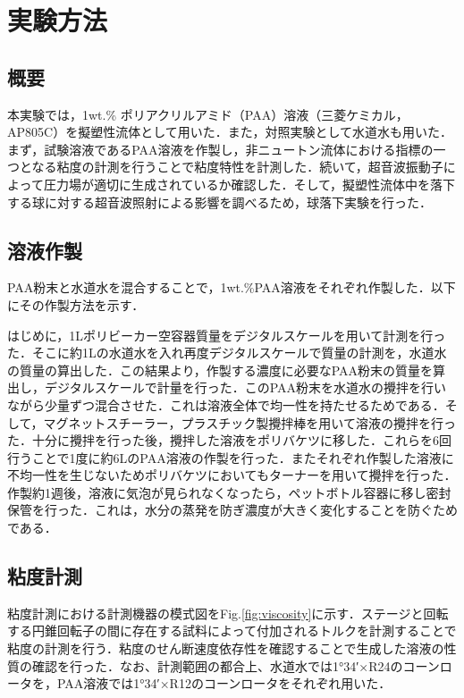 \section{実験方法}
\label{sec:methods}
\subsection{概要}
本実験では，1wt.\% ポリアクリルアミド（PAA）溶液（三菱ケミカル，AP805C）を擬塑性流体として用いた．また，対照実験として水道水も用いた．まず，試験溶液であるPAA溶液を作製し，非ニュートン流体における指標の一つとなる粘度の計測を行うことで粘度特性を計測した．続いて，超音波振動子によって圧力場が適切に生成されているか確認した．そして，擬塑性流体中を落下する球に対する超音波照射による影響を調べるため，球落下実験を行った．

\subsection{溶液作製}

PAA粉末と水道水を混合することで，1wt.\%PAA溶液をそれぞれ作製した．以下にその作製方法を示す．

はじめに，1Lポリビーカー空容器質量をデジタルスケールを用いて計測を行った．そこに約1Lの水道水を入れ再度デジタルスケールで質量の計測を，水道水の質量の算出した．この結果より，作製する濃度に必要なPAA粉末の質量を算出し，デジタルスケールで計量を行った．このPAA粉末を水道水の攪拌を行いながら少量ずつ混合させた．これは溶液全体で均一性を持たせるためである．そして，マグネットスチーラー，プラスチック製攪拌棒を用いて溶液の攪拌を行った．十分に攪拌を行った後，攪拌した溶液をポリバケツに移した．これらを6回行うことで1度に約6LのPAA溶液の作製を行った．またそれぞれ作製した溶液に不均一性を生じないためポリバケツにおいてもターナーを用いて攪拌を行った．作製約1週後，溶液に気泡が見られなくなったら，ペットボトル容器に移し密封保管を行った．これは，水分の蒸発を防ぎ濃度が大きく変化することを防ぐためである．

\subsection{粘度計測}
粘度計測における計測機器の模式図をFig.\ref{fig:viscosity}に示す．ステージと回転する円錐回転子の間に存在する試料によって付加されるトルクを計測することで粘度の計測を行う．粘度のせん断速度依存性を確認することで生成した溶液の性質の確認を行った．なお、計測範囲の都合上、水道水では1°34′×R24のコーンロータを，PAA溶液では1°34′×R12のコーンロータをそれぞれ用いた．

